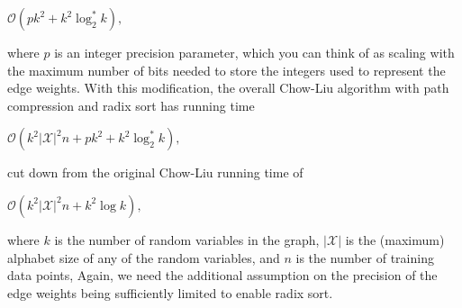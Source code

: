 {\centering$\mathcal{O}(p k^{2} + k^2\log _2^* k),$ \par}
 
where $p$ is an integer precision parameter, which you can think of as scaling with the maximum number of bits needed to store the integers used to represent the edge weights. With this modification, the overall Chow-Liu algorithm with path compression and radix sort has running time

{\centering$\mathcal{O}(k^{2}|\mathcal{X}|^{2}n + p k^{2} + k^2\log _2^* k),$ \par}
 
cut down from the original Chow-Liu running time of

{\centering$\mathcal{O}(k^{2}|\mathcal{X}|^{2}n+k^{2}\log k),$ \par}
 
where $k$ is the number of random variables in the graph, $|\mathcal{X}|$ is the (maximum) alphabet size of any of the random variables, and $n$ is the number of training data points, Again, we need the additional assumption on the precision of the edge weights being sufficiently limited to enable radix sort.




